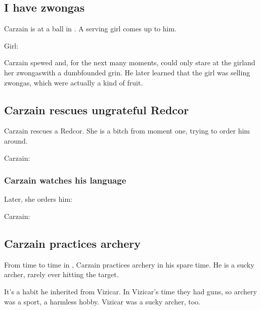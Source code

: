 \begin{garbage}
\subsection{I have zwongas}
Carzain is at a ball in \Redce. 
A serving girl comes up to him. 

Girl: 

Carzain spewed and, for the next many moments, could only stare at the girl\dash and her zwongas\dash with a dumbfounded grin. 
He later learned that the girl was selling zwongas, which were actually a kind of fruit. 









\subsection{Carzain rescues ungrateful Redcor}
Carzain rescues a Redcor. 
She is a bitch from moment one, trying to order him around. 

Carzain: 








\subsubsection{Carzain watches his language}
Later, she orders him: 

Carzain: 







\subsection{Carzain practices archery}
From time to time in \Redce, Carzain practices archery in his spare time. 
He is a sucky archer, rarely ever hitting the target. 

It's a habit he inherited from Vizicar. 
In Vizicar's time they had guns, so archery was a sport, a harmless hobby. 
Vizicar was a sucky archer, too. 








\end{garbage}
